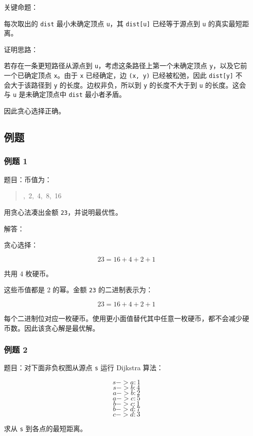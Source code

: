 \documentclass[UTF8,zihao=-4]{ctexart}
\begin{document}
关键命题：

每次取出的 \texttt{dist} 最小未确定顶点 \texttt{u}，其 \texttt{dist[u]} 已经等于源点到 \texttt{u} 的真实最短距离。

证明思路：

若存在一条更短路径从源点到 \texttt{u}，考虑这条路径上第一个未确定顶点 \texttt{y}，以及它前一个已确定顶点 \texttt{x}。由于 \texttt{x} 已经确定，边 \texttt{(x, y)} 已经被松弛，因此 \texttt{dist[y]} 不会大于该路径到 \texttt{y} 的长度。边权非负，所以到 \texttt{y} 的长度不大于到 \texttt{u} 的长度。这会与 \texttt{u} 是未确定顶点中 \texttt{dist} 最小者矛盾。

因此贪心选择正确。

\subsection*{例题}

\subsubsection*{例题 1}

题目：币值为：

\begin{quote}
\small\ttfamily\raggedright
{},\ 2,\ 4,\ 8,\ 16\\
\end{quote}

用贪心法凑出金额 \texttt{23}，并说明最优性。

解答：

贪心选择：

\[23 = 16 + 4 + 2 + 1\]

共用 4 枚硬币。

这些币值都是 2 的幂。金额 \texttt{23} 的二进制表示为：

\[23 = 16 + 4 + 2 + 1\]

每个二进制位对应一枚硬币。使用更小面值替代其中任意一枚硬币，都不会减少硬币数。因此该贪心解是最优解。

\subsubsection*{例题 2}

题目：对下面非负权图从源点 \texttt{s} 运行 Dijkstra 算法：

\[s->a: 1\]
\[s->b: 4\]
\[a->b: 2\]
\[a->c: 5\]
\[b->c: 1\]
\[b->d: 7\]
\[c->d: 3\]

求从 \texttt{s} 到各点的最短距离。
\end{document}
